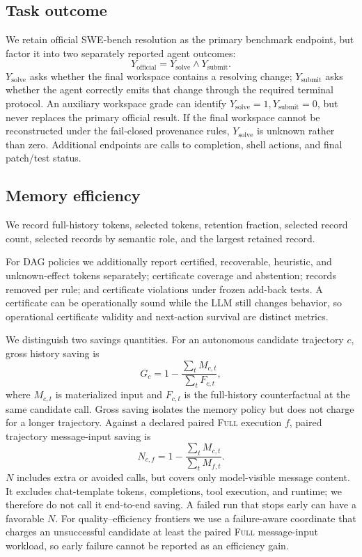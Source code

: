 \documentclass[11pt]{article}
\begin{document}
\subsection{Task outcome}

We retain official SWE-bench resolution as the primary benchmark endpoint, but
factor it into two separately reported agent outcomes:
\[
Y_{\mathrm{official}}=Y_{\mathrm{solve}}\land Y_{\mathrm{submit}}.
\]
$Y_{\mathrm{solve}}$ asks whether the final workspace contains a resolving
change; $Y_{\mathrm{submit}}$ asks whether the agent correctly emits that change
through the required terminal protocol. An auxiliary workspace grade can
identify $Y_{\mathrm{solve}}=1,Y_{\mathrm{submit}}=0$, but never replaces the
primary official result. If the final workspace cannot be reconstructed under
the fail-closed provenance rules, $Y_{\mathrm{solve}}$ is unknown rather than
zero. Additional endpoints are calls to completion, shell actions, and final
patch/test status.

\subsection{Memory efficiency}

We record full-history tokens, selected tokens, retention fraction, selected
record count, selected records by semantic role, and the largest retained
record.

For DAG policies we additionally report certified, recoverable, heuristic, and
unknown-effect tokens separately; certificate coverage and abstention; records
removed per rule; and certificate violations under frozen add-back tests. A
certificate can be operationally sound while the LLM still changes behavior,
so operational certificate validity and next-action survival are distinct
metrics.

We distinguish two savings quantities.  For an autonomous candidate trajectory
$c$, gross history saving is
\[
G_c=1-\frac{\sum_t M_{c,t}}{\sum_t F_{c,t}},
\]
where $M_{c,t}$ is materialized input and $F_{c,t}$ is the full-history
counterfactual at the same candidate call.  Gross saving isolates the memory
policy but does not charge for a longer trajectory.  Against a declared paired
\textsc{Full} execution $f$, paired trajectory message-input saving is
\[
N_{c,f}=1-\frac{\sum_t M_{c,t}}{\sum_t M_{f,t}}.
\]
$N$ includes extra or avoided calls, but covers only model-visible message
content. It excludes chat-template tokens, completions, tool execution, and
runtime; we therefore do not call it end-to-end saving. A failed run that
stops early can have a favorable $N$. For quality--efficiency frontiers we use
a failure-aware coordinate that charges an unsuccessful candidate at least
the paired \textsc{Full} message-input workload, so early failure cannot be
reported as an efficiency gain.
\end{document}
